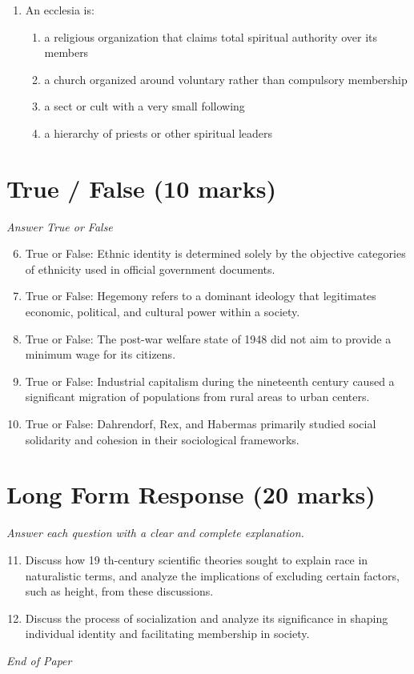 \documentclass[12pt]{article}
\begin{document}
\begin{enumerate}[label=\arabic*.]
\begin{enumerate}[label=(\alph*)]
    \item the absence of fathers in many households
    \item the increasing number of single parent families
\end{enumerate}
\item An ecclesia is:
\begin{enumerate}[label=(\alph*)]
    \item a religious organization that claims total spiritual authority over its members
    \item a church organized around voluntary rather than compulsory membership
    \item a sect or cult with a very small following
    \item a hierarchy of priests or other spiritual leaders
\end{enumerate}
\end{enumerate}

\section*{True / False (10 marks)}
\textit{Answer True or False}
\begin{enumerate}[label=\arabic*.]
\setcounter{enumi}{5}
\item True or False: Ethnic identity is determined solely by the objective categories of ethnicity used in official government documents.
\item True or False: Hegemony refers to a dominant ideology that legitimates economic, political, and cultural power within a society.
\item True or False: The post-war welfare state of 1948 did not aim to provide a minimum wage for its citizens.
\item True or False: Industrial capitalism during the nineteenth century caused a significant migration of populations from rural areas to urban centers.
\item True or False: Dahrendorf, Rex, and Habermas primarily studied social solidarity and cohesion in their sociological frameworks.
\end{enumerate}

\section*{Long Form Response (20 marks)}
\textit{Answer each question with a clear and complete explanation.}
\begin{enumerate}[label=\arabic*.]
\setcounter{enumi}{10}
\item Discuss how 19 th-century scientific theories sought to explain race in naturalistic terms, and analyze the implications of excluding certain factors, such as height, from these discussions.
\item Discuss the process of socialization and analyze its significance in shaping individual identity and facilitating membership in society.
\end{enumerate}

\vfill
\noindent\textit{End of Paper}
\end{document}
